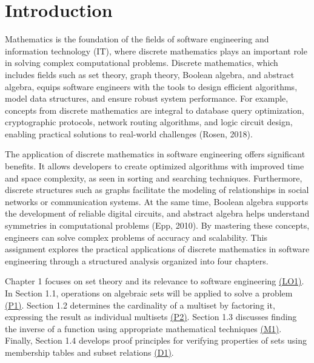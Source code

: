 \documentclass[12pt, a4paper]{report} %
\begin{document}


\tableofcontents 

\newpage


\section*{Introduction}
Mathematics is the foundation of the fields of software engineering and information technology (IT), where discrete mathematics plays an important role in solving complex computational problems. Discrete mathematics, which includes fields such as set theory, graph theory, Boolean algebra, and abstract algebra, equips software engineers with the tools to design efficient algorithms, model data structures, and ensure robust system performance. For example, concepts from discrete mathematics are integral to database query optimization, cryptographic protocols, network routing algorithms, and logic circuit design, enabling practical solutions to real-world challenges (Rosen, 2018).

The application of discrete mathematics in software engineering offers significant benefits. It allows developers to create optimized algorithms with improved time and space complexity, as seen in sorting and searching techniques. Furthermore, discrete structures such as graphs facilitate the modeling of relationships in social networks or communication systems. At the same time, Boolean algebra supports the development of reliable digital circuits, and abstract algebra helps understand symmetries in computational problems (Epp, 2010). By mastering these concepts, engineers can solve complex problems of accuracy and scalability. This assignment explores the practical applications of discrete mathematics in software engineering through a structured analysis organized into four chapters.

Chapter 1 focuses on set theory and its relevance to software engineering \hyperref[chap:LO1]{(LO1)}. In Section 1.1, operations on algebraic sets will be applied to solve a problem \hyperref[sec:P1]{(P1)}. Section 1.2 determines the cardinality of a multiset by factoring it, expressing the result as individual multisets \hyperref[sec:P1]{(P2)}. Section 1.3 discusses finding the inverse of a function using appropriate mathematical techniques \hyperref[sec:M1]{(M1)}. Finally, Section 1.4 develops proof principles for verifying properties of sets using membership tables and subset relations \hyperref[sec:D1]{(D1)}. 
\end{document}
